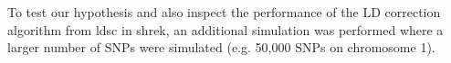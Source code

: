 \documentclass[12pt]{scrbook}
\begin{document}
To test our hypothesis and also inspect the performance of the \gls{LD} correction algorithm from \gls{ldsc} in \gls{shrek}, an additional simulation was performed where a larger number of \glspl{SNP} were simulated (e.g. 50,000 \glspl{SNP} on chromosome 1).

\begin{figure}[t]
	\centering
\end{figure}
\end{document}
